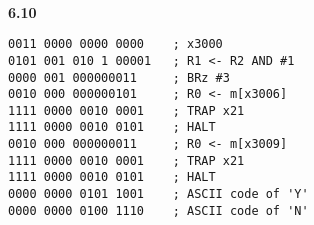 \documentclass[a4paper,12pt]{article}     %
\begin{document}
~\\
\textbf{6.10}\\
\begin{Verbatim}[frame = single]
0011 0000 0000 0000    ; x3000
0101 001 010 1 00001   ; R1 <- R2 AND #1
0000 001 000000011     ; BRz #3
0010 000 000000101     ; R0 <- m[x3006]
1111 0000 0010 0001    ; TRAP x21
1111 0000 0010 0101    ; HALT
0010 000 000000011     ; R0 <- m[x3009]
1111 0000 0010 0001    ; TRAP x21
1111 0000 0010 0101    ; HALT
0000 0000 0101 1001    ; ASCII code of 'Y'
0000 0000 0100 1110    ; ASCII code of 'N'
\end{Verbatim}
\end{document}
